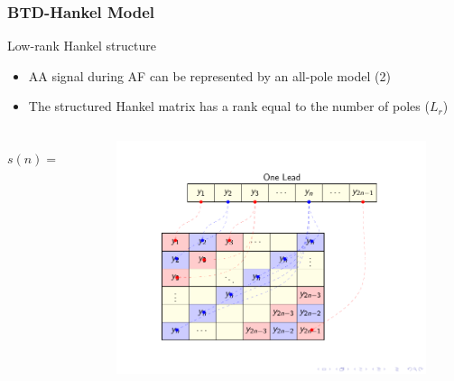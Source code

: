 \documentclass{beamer}
\begin{document}
	\begin{frame}
		\frametitle{BTD-Hankel Model}
		
		\vspace{-0.5cm}
		\begin{block}{Low-rank Hankel structure}
			\begin{itemize}
				\item AA signal during AF can be represented by an all-pole model (2)
			\end{itemize}
			\begin{itemize}
				\item The structured Hankel matrix has a rank equal to the number of poles ($L_{r}$)
			\end{itemize}
		\end{block}
		\begin{columns}
			\begin{column}{0.5\textwidth}		
				\vspace{2.5cm}
				\begin{equation}
					s(n) = \sum_{\ell = 1}^{L_{r}} \alpha_{\ell} z_{\ell}^{n}
				\end{equation}
			\end{column}
			\begin{column}{0.5\textwidth}
				\begin{figure}[htb]
					\vspace{-5.0cm}
					\centering
					\includegraphics[scale=0.66,clip=true,trim={1.5cm 8.5cm 1.8cm 8.3cm}]{tikz_mapHankel.pdf}
				\end{figure}
			\end{column}
		\end{columns}
	\end{frame}
\end{document}
